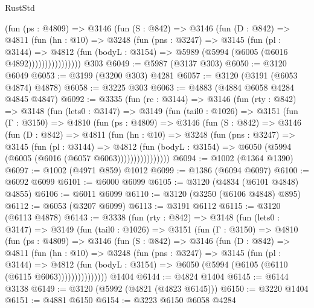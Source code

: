 \begin{lexlean}{RustStd}
\begin{coremodule}
                (fun (ps : @4809) =>
                @3146
                  (fun (S : @842) =>
                  @3146
                    (fun (D : @842) =>
                    @4811
                      (fun (hn : @10) =>
                      @3248
                        (fun (pns : @3247) =>
                        @3145
                          (fun (pl : @3144) =>
                          @4812
                            (fun (bodyL : @3154) => @5989 (@5994 (@6005 (@6016 @4892))))))))))))))))
    @303
@6049 := @5987 (@3137 @303)
@6050 := @3120 @6049
@6053 := @3199 (@3200 @303) @4281
@6057 := @3120 (@3191 (@6053 @4874) @4878)
@6058 := @3225 @303
@6063 := @4883 (@4884 @6058 @4284 @4845 @4847)
@6092 := @3335
    (fun (rc : @3144) =>
    @3146
      (fun (rty : @842) =>
      @3148
        (fun (lets0 : @3147) =>
        @3149
          (fun (tail0 : @1026) =>
          @3151
            (fun (Γ : @3150) =>
            @4810
              (fun (ps : @4809) =>
              @3146
                (fun (S : @842) =>
                @3146
                  (fun (D : @842) =>
                  @4811
                    (fun (hn : @10) =>
                    @3248
                      (fun (pns : @3247) =>
                      @3145
                        (fun (pl : @3144) =>
                        @4812
                          (fun (bodyL : @3154) =>
                          @6050 (@5994 (@6005 (@6016 (@6057 @6063))))))))))))))))
@6094 := @1002 (@1364 @1390)
@6097 := @1002 (@4971 @859) @1012
@6099 := @1386 (@6094 @6097)
@6100 := @6092 @6099
@6101 := @6000 @6099
@6105 := @3120 (@4834 (@6101 @4848) @4855)
@6106 := @6011 @6099
@6110 := @3120 (@3250 (@6106 @4848) @895)
@6112 := @6053 (@3207 @6099)
@6113 := @3191 @6112
@6115 := @3120 (@6113 @4878)
@6143 := @3338
    (fun (rty : @842) =>
    @3148
      (fun (lets0 : @3147) =>
      @3149
        (fun (tail0 : @1026) =>
        @3151
          (fun (Γ : @3150) =>
          @4810
            (fun (ps : @4809) =>
            @3146
              (fun (S : @842) =>
              @3146
                (fun (D : @842) =>
                @4811
                  (fun (hn : @10) =>
                  @3248
                    (fun (pns : @3247) =>
                    @3145
                      (fun (pl : @3144) =>
                      @4812
                        (fun (bodyL : @3154) =>
                        @6050 (@5994 (@6105 (@6110 (@6115 @6063)))))))))))))))
    @1404
@6144 := @4824 @1404
@6145 := @6144 @3138
@6149 := @3120 (@5992 (@4821 (@4823 @6145)))
@6150 := @3220 @1404
@6151 := @4881 @6150
@6154 := @3223 @6150 @6058 @4284

\end{coremodule}
\end{lexlean}
